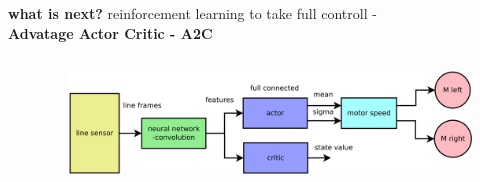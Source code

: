 \documentclass[xcolor=dvipsnames]{beamer}
\begin{document}
\begin{frame}{\bf what is next?}
reinforcement learning to take full controll - \\
{\bf Advatage Actor Critic - A2C}



\begin{columns}

  \begin{column}{0.3\textwidth}



  \end{column}

  \begin{column}{0.7\textwidth}  %

      \begin{figure}
        \includegraphics[scale=0.14]{../diagrams/a2c_line_following.png}
      \end{figure}



\end{column}
\end{columns}
\end{frame}
\end{document}

